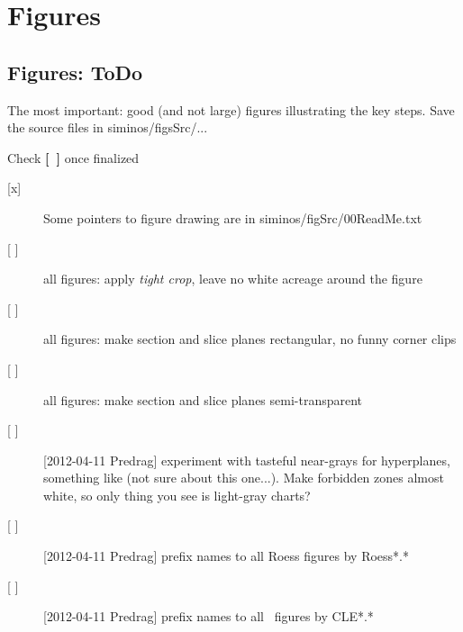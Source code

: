 
\section{Figures}
\label{s:figures}

\subsection{Figures: ToDo}
\label{s:figsToDo}

The most important: good (and not large) figures illustrating the key
steps. Save the source files in siminos/figsSrc/...

Check {\bf [~]} once finalized
\begin{description}

\item[{[x]}] Some pointers to figure drawing are in
             {siminos/figSrc/00ReadMe.txt}
\item[{[ ]}] all figures: apply \emph{tight crop}, leave no white acreage around the figure
\item[{[ ]}] all figures: make section and slice planes rectangular, no funny corner clips
\item[{[ ]}] all figures: make section and slice planes semi-transparent
\item[{[ ]}] [2012-04-11 Predrag] experiment with tasteful near-grays for hyperplanes,
    something like  (not sure about this one...).
    Make forbidden zones almost white, so only thing you see is light-gray charts?
\item[{[ ]}] [2012-04-11 Predrag] prefix names to all Roess figures by Roess*.*
\item[{[ ]}] [2012-04-11 Predrag] prefix names to all \cLe\ figures by CLE*.*


\end{description}
